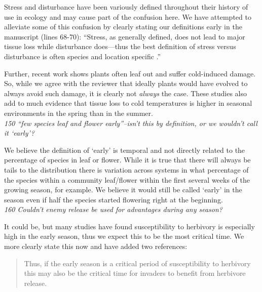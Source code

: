 \documentclass[11pt,a4paper]{letter}
\begin{document}
\begin{letter}{}
Stress and disturbance have been variously defined throughout their history of use in ecology and may cause part of the confusion here. We have attempted to alleviate some of this confusion by clearly stating our definitions early in the manuscript (lines 68-70): ``Stress, as generally defined, does not lead to major tissue loss while disturbance does---thus the best definition of stress versus disturbance is often species and location specific \citep{crainebook}.''

Further, recent \citep{Inouye:2008gj,Augspurger:2009gj} work shows plants often leaf out and suffer cold-induced damage. So, while we agree with the reviewer that ideally plants would have evolved to always avoid such damage, it is clearly not \emph{always} the case. These studies also add to much evidence \citep[e.g.,][]{Korner:2003} that tissue loss to cold temperatures is higher in seasonal environments in the spring than in the summer. \\

\emph{150 ``few species leaf and flower early''--isn't this by definition, or we wouldn't call it `early'?}

We believe the definition of `early' is temporal and not directly related to the percentage of species in leaf or flower. While it is true that there will always be tails to the distribution there is variation across systems in what percentage of the species within a community leaf/flower within the first several weeks of the growing season, for example. We believe it would still be called `early' in the season even if half the species started flowering right at the beginning.   \\

\emph{160 Couldn't enemy release be used for advantages during any season?}

It could be, but many studies have found susceptibility to herbivory is especially high in the early season, thus we expect this to be the most critical time. We more clearly state this now and have added two references:
\begin{quote}
Thus, if the early season is a critical period of susceptibility to herbivory \citep{Feeny1970,Barbehenn2013} this may also be the critical time for invaders to benefit from herbivore release.
\end{quote}


\end{letter}
\end{document}
